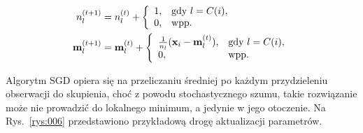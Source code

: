 \documentclass{praca1}
\begin{document}
\begin{align}
n^{(t+1)}_l& = n^{(t)}_l + \left\{
\begin{array}{l l}     
    1, & \text{gdy } l = C(i), \\
    0, & \text{wpp.}
\end{array}\right. \\
\mathbf{m}_l^{(t+1)}& = \mathbf{m}_l^{(t)} + \left\{
\begin{array}{l l}     
    \frac{1}{n_l}(\mathbf{x}_i - \mathbf{m}^{(t)}_l), & \text{gdy } l = C(i), \\
    0, & \text{wpp.}
\end{array}\right.
\end{align}


Algorytm SGD opiera się na przeliczaniu średniej po każdym przydzieleniu obserwacji do skupienia, choć z powodu stochastycznego szumu, takie rozwiązanie może nie prowadzić do lokalnego minimum, a jedynie w jego otoczenie. Na Rys.~\ref{rys:006} przedstawiono przykładową drogę aktualizacji parametrów. 
\end{document}
